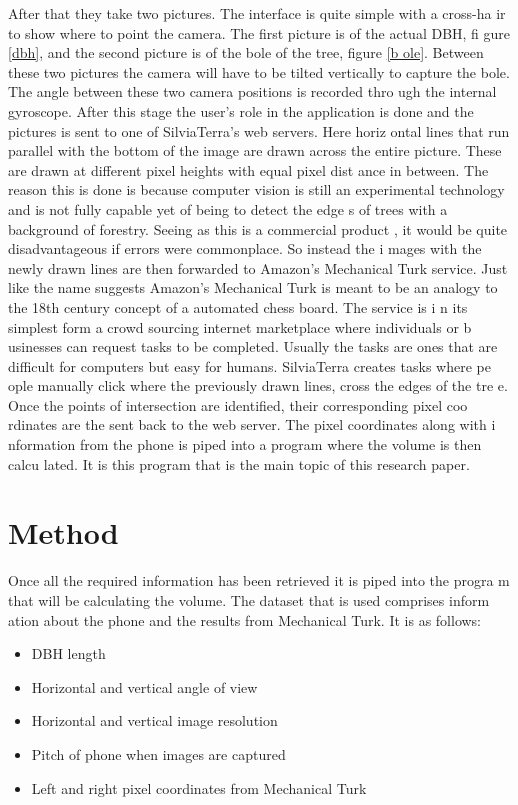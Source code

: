 After that they take two pictures. The interface is quite simple with a cross-ha
ir to show where to point the camera. The first picture is of the actual DBH, fi
gure \ref{dbh}, and the second picture is of the bole of the tree, figure \ref{b
ole}. Between these two pictures the camera will have to be tilted vertically to
 capture the bole. The angle between these two camera positions is recorded thro
ugh the internal gyroscope. After this stage the user's role in the application 
is done and the pictures is sent to one of SilviaTerra's web servers. Here horiz
ontal lines that run parallel with the bottom of the image are drawn across the 
entire picture. These are drawn at different pixel heights with equal pixel dist
ance in between. The reason this is done is because computer vision is still an 
experimental technology and is not fully capable yet of being to detect the edge
s of trees with a background of forestry. Seeing as this is a commercial product
, it would be quite disadvantageous if errors were commonplace. So instead the i
mages with the newly drawn lines are then forwarded to Amazon's Mechanical Turk 
service. Just like the name suggests Amazon's Mechanical Turk is meant to be an 
analogy to the 18th century concept of a automated chess board. The service is i
n its simplest form a crowd sourcing internet marketplace where individuals or b
usinesses can request tasks to be completed. Usually the tasks are ones that are
 difficult for computers but easy for humans. SilviaTerra creates tasks where pe
ople manually click where the previously drawn lines, cross the edges of the tre
e. Once the points of intersection are identified, their corresponding pixel coo
rdinates are the sent back to the web server. The pixel coordinates along with i
nformation from the phone is piped into a program where the volume is then calcu
lated. It is this program that is the main topic of this research paper.

\section{Method}
Once all the required information has been retrieved it is piped into the progra
m that will be calculating the volume. The dataset that is used comprises inform
ation about the phone and the results from Mechanical Turk. It is as follows:
\begin{itemize}
	\item DBH length
	\item Horizontal and vertical angle of view
	\item Horizontal and vertical image resolution
	\item Pitch of phone when images are captured
	\item Left and right pixel coordinates from Mechanical Turk
\end{itemize}

